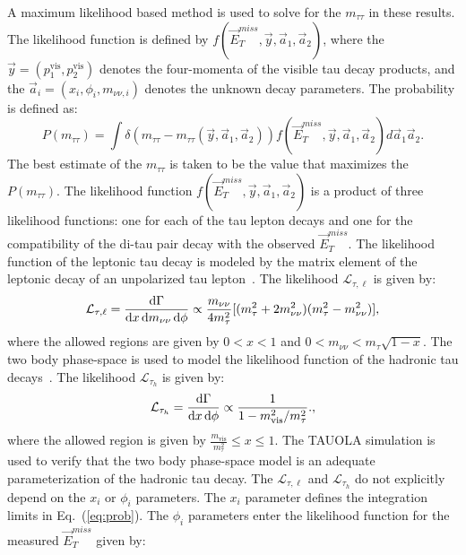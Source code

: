 A maximum likelihood based method is used to solve for the $m_{\tau\tau}$ in these results. The likelihood function is defined by $f(\vec{E}_T^{miss},\vec{y},\vec{a}_1,\vec{a}_2)$, where the $\vec{y}=(p_1^{\mathrm{vis}},p_2^{\mathrm{vis}})$ denotes the four-momenta of the visible tau decay products, and the $\vec{a}_i=(x_i,\phi_i,m_{\nu\nu,i})$ denotes the unknown decay parameters. The probability is defined as:
\begin{equation} \label{eq:prob}
P(m_{\tau\tau}) = \int \delta(m_{\tau\tau}-m_{\tau\tau}(\vec{y},\vec{a}_1,\vec{a}_2)) f(\vec{E}_T^{miss}, \vec{y},\vec{a}_1,\vec{a}_2)d\vec{a}_1\vec{a}_2.
\end{equation}
The best estimate of the $m_{\tau\tau}$ is taken to be the value that maximizes the $P(m_{\tau\tau})$. The likelihood function $f(\vec{E}_T^{miss},\vec{y},\vec{a}_1,\vec{a}_2)$ is a product of three likelihood functions: one for each of the tau lepton decays and one for the compatibility of the di-tau pair decay with the observed $\vec{E}_T^{miss}$. The likelihood function of the leptonic tau decay is modeled by the matrix element of the leptonic decay of an unpolarized tau lepton~\cite{TauPol}. The likelihood $\mathcal{L}_{\tau,\ell}$ is given by:     
\begin{equation} 
\mathcal{L}_{\tau,\ell} = \frac{{\rm d}\Gamma}{{\rm d}x\,{\rm d}m_{\nu\nu}\,{\rm d}\phi} \propto \frac{m_{\nu\nu}}{4m_{\tau}^2} [(m_{\tau}^2 +2m_{\nu\nu}^2 )(m_{\tau}^2 - m_{\nu\nu}^2)],
\label{eq:likelihoodLepTauDecay}
\end{equation}
where the allowed regions are given by $0<x<1$ and $0<m_{\nu\nu}<m_{\tau}\sqrt{1-x}$. The two body phase-space is used to model the likelihood function of the hadronic tau decays~\cite{Agashe:2014kda}. The likelihood  $\mathcal{L}_{\tau_{h}}$ is given by:
\begin{equation}
\mathcal{L}_{\tau_{h}} = \frac{{\rm d}\Gamma}{{\rm d}x\,{\rm d}\phi} \propto \frac{1}{1- m^2_{\rm vis}/m^2_{\tau}}.,
\label{eq:likelihoodHadTauDecay}
\end{equation}
where the allowed region is given by $\frac{m_{\mathrm{vis}}}{m_{\tau}^2}\leq x \leq 1$. The TAUOLA simulation is used to verify that the two body phase-space model is an adequate parameterization of the hadronic tau decay. The $\mathcal{L}_{\tau,\ell}$  and $\mathcal{L}_{\tau_{h}}$  do not explicitly depend on the $x_i$ or $\phi_i$ parameters. The $x_i$ parameter defines the integration limits in Eq.~(\ref{eq:prob}). The $\phi_i$ parameters enter the likelihood function for the measured $\vec{E}_{T}^{miss}$ given by:
